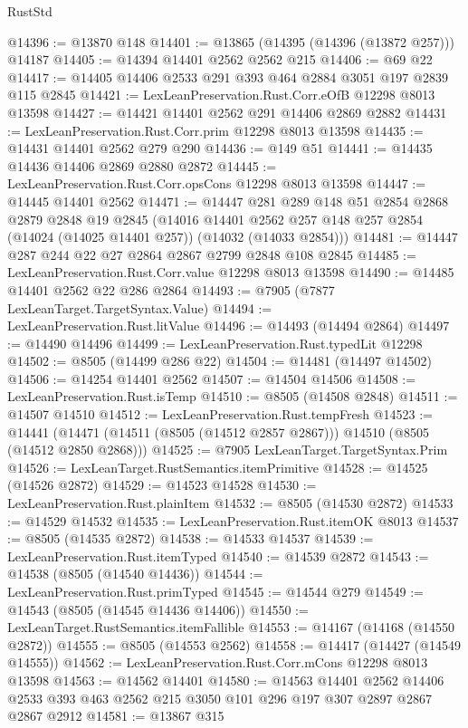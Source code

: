 \begin{lexlean}{RustStd}
\begin{coremodule}
@14396 := @13870 @148
@14401 := @13865 (@14395 (@14396 (@13872 @257))) @14187
@14405 := @14394 @14401 @2562 @2562 @215
@14406 := @69 @22
@14417 := @14405 @14406 @2533 @291 @393 @464 @2884 @3051 @197 @2839 @115 @2845
@14421 := LexLeanPreservation.Rust.Corr.eOfB @12298 @8013 @13598
@14427 := @14421 @14401 @2562 @291 @14406 @2869 @2882
@14431 := LexLeanPreservation.Rust.Corr.prim @12298 @8013 @13598
@14435 := @14431 @14401 @2562 @279 @290
@14436 := @149 @51
@14441 := @14435 @14436 @14406 @2869 @2880 @2872
@14445 := LexLeanPreservation.Rust.Corr.opsCons @12298 @8013 @13598
@14447 := @14445 @14401 @2562
@14471 := @14447
    @281
    @289
    @148
    @51
    @2854
    @2868
    @2879
    @2848
    @19
    @2845
    (@14016 @14401 @2562 @257 @148 @257 @2854 (@14024 (@14025 @14401 @257)) (@14032 (@14033 @2854)))
@14481 := @14447 @287 @244 @22 @27 @2864 @2867 @2799 @2848 @108 @2845
@14485 := LexLeanPreservation.Rust.Corr.value @12298 @8013 @13598
@14490 := @14485 @14401 @2562 @22 @286 @2864
@14493 := @7905 (@7877 LexLeanTarget.TargetSyntax.Value)
@14494 := LexLeanPreservation.Rust.litValue
@14496 := @14493 (@14494 @2864)
@14497 := @14490 @14496
@14499 := LexLeanPreservation.Rust.typedLit @12298
@14502 := @8505 (@14499 @286 @22)
@14504 := @14481 (@14497 @14502)
@14506 := @14254 @14401 @2562
@14507 := @14504 @14506
@14508 := LexLeanPreservation.Rust.isTemp
@14510 := @8505 (@14508 @2848)
@14511 := @14507 @14510
@14512 := LexLeanPreservation.Rust.tempFresh
@14523 := @14441 (@14471 (@14511 (@8505 (@14512 @2857 @2867))) @14510 (@8505 (@14512 @2850 @2868)))
@14525 := @7905 LexLeanTarget.TargetSyntax.Prim
@14526 := LexLeanTarget.RustSemantics.itemPrimitive
@14528 := @14525 (@14526 @2872)
@14529 := @14523 @14528
@14530 := LexLeanPreservation.Rust.plainItem
@14532 := @8505 (@14530 @2872)
@14533 := @14529 @14532
@14535 := LexLeanPreservation.Rust.itemOK @8013
@14537 := @8505 (@14535 @2872)
@14538 := @14533 @14537
@14539 := LexLeanPreservation.Rust.itemTyped
@14540 := @14539 @2872
@14543 := @14538 (@8505 (@14540 @14436))
@14544 := LexLeanPreservation.Rust.primTyped
@14545 := @14544 @279
@14549 := @14543 (@8505 (@14545 @14436 @14406))
@14550 := LexLeanTarget.RustSemantics.itemFallible
@14553 := @14167 (@14168 (@14550 @2872))
@14555 := @8505 (@14553 @2562)
@14558 := @14417 (@14427 (@14549 @14555))
@14562 := LexLeanPreservation.Rust.Corr.mCons @12298 @8013 @13598
@14563 := @14562 @14401
@14580 := @14563
    @14401
    @2562
    @14406
    @2533
    @393
    @463
    @2562
    @215
    @3050
    @101
    @296
    @197
    @307
    @2897
    @2867
    @2867
    @2912
@14581 := @13867 @315

\end{coremodule}
\end{lexlean}
